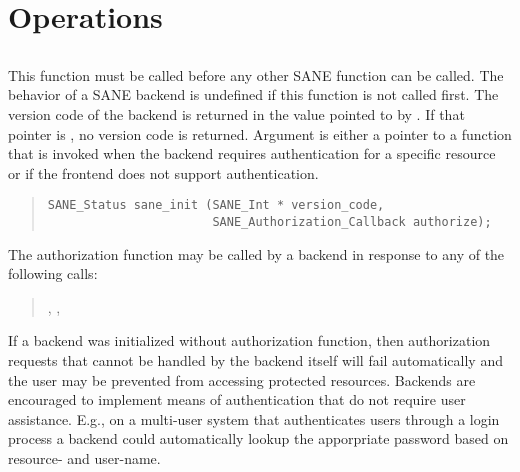 \documentclass[11pt,DVIps]{report}
\begin{document}
\section{Operations}

\subsection{}

This function must be called before any other SANE function can be
called.  The behavior of a SANE backend is undefined if this function
is not called first.  The version code of the backend is returned in
the value pointed to by .  If that pointer is
, no version code is returned. 
  Argument  is either a pointer to a function that is
  invoked when the backend requires authentication for a specific
  resource or  if the frontend does not support
  authentication.
\begin{quote}
\begin{verbatim}
SANE_Status sane_init (SANE_Int * version_code,
                       SANE_Authorization_Callback authorize);
\end{verbatim}
\end{quote}

The authorization function may be called by a backend in response to
any of the following calls:
\begin{quote}
  , , 
\end{quote}
If a backend was initialized without authorization function, then
authorization requests that cannot be handled by the backend itself
will fail automatically and the user may be prevented from accessing
protected resources.  Backends are encouraged to implement means of
authentication that do not require user assistance.  E.g., on a
multi-user system that authenticates users through a login process a
backend could automatically lookup the apporpriate password based on
resource- and user-name.
\end{document}

